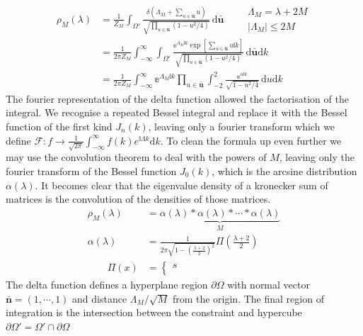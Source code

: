\documentclass{article}[12pt]
\numberwithin{equation}{section}
\begin{document}
\begin{align*}
  \rho_M(\lambda)&=\frac{1}{Z_M}
  \int_{\Omega'}\!
  \frac{\delta(\Lambda_M+\sum_{u\in\bar{\mathbf{u}}}u)}
  {\sqrt{\prod_{u\in\bar{\mathbf{u}}}(1-u^2/4) }}
  \,\mathrm{d}\bar{\mathbf{u}}
  \qquad
  \begin{matrix}
    \Lambda_M=\lambda+2M \\
    |\Lambda_M|\leq2M
  \end{matrix}\\
  &=\frac{1}{2\pi Z_M}
  \int_{-\infty}^{\infty}\int_{\Omega'}\!
  \frac{\mathbb{e}^{\Lambda_M\mathbb{i}k}\exp[\sum_{u\in\bar{\mathbf{u}}}u\mathbb{i}k]}
  {\sqrt{\prod_{u\in\bar{\mathbf{u}}}(1-u^2/4) }}
  \,\mathrm{d}\bar{\mathbf{u}}\mathrm{d}k\\
  &=\frac{1}{2\pi Z_M}
  \int_{-\infty}^{\infty}\mathbb{e}^{\Lambda_M\mathbb{i}k}
  \prod_{u\in\bar{\mathbf{u}}}\int_{-2}^{2}\!
  \frac{\mathbb{e}^{u\mathbb{i}k}}
  {\sqrt{1-u^2/4}}
  \,\mathrm{d}u\mathrm{d}k
\end{align*}
The fourier representation of the delta function allowed the
factorisation of the integral. We recognise a repeated Bessel
integral and replace it with the Bessel function of the first kind
$J_n(k)$, leaving only a fourier transform which we define
$ \mathcal{F} :
f\rightarrow \frac{1}{\sqrt{2\pi}}
\int_{-\infty}^{\infty}f(k)e^{\mathbb{i}\Lambda k}\mathrm{d}k$. To clean
the formula up even further we may use the convolution
theorem to deal with the powers of $M$, leaving only the fourier
transform of the Bessel function $J_0(k)$, which is the arcsine
distribution $\alpha(\lambda)$. It becomes clear that the eigenvalue
density of a kronecker sum of matrices is the convolution of the densities
of those matrices.
\begin{align}
  \rho_M(\lambda)&=\underbrace{
  \alpha(\lambda)*\alpha(\lambda)*\cdots*\alpha(\lambda)}_{M}\\
  \alpha(\lambda)&=\frac{1}{2\pi\sqrt{1-\left(\frac{\lambda+2}{2}\right)^2}}
  \Pi\left(\frac{\lambda+2}{2}\right)\\
  \qquad\Pi(x)&=
  \begin{cases}
    s \\
  \end{cases}
\end{align}
The delta function defines a hyperplane region $\partial\Omega$ with
normal vector $\bar{\mathbf{n}}=(1,\cdots,1)$ and distance
$\Lambda_M/\sqrt{M}$ from the origin. The final region of
integration is the intersection between the constraint and hypercube
$\partial\Omega'=\Omega'\cap\partial\Omega$
\end{document}
